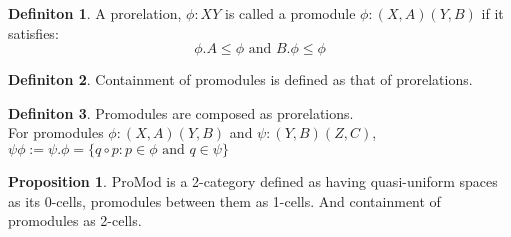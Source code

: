 \documentclass[18pt,a4paper]{article}
\makeatletter
\theoremstyle{definition}
\newtheorem{definition}{Definiton}[section]
\newtheorem{proop}{Proposition}[section]
\newcommand{\carrow}{}%
\DeclareRobustCommand{\carrow}{%
	\mathrel{\vphantom{\rightarrow}\mathpalette\circle@arrow\relax}%
}
\newcommand{\circle@arrow}[2]{%
	\m@th
	\ooalign{%
		\hidewidth$#1\circ\mkern1mu$\hidewidth\cr
	$#1\longrightarrow$\cr}%
}
\makeatother
\begin{document}
	\begin{definition}%
		A prorelation, $\phi:X \carrow Y$ is called a promodule $\phi: (X,A) \carrow (Y,B)$  if it
		satisfies:
		\[ \phi.A \leq \phi \text{ and } B. \phi \leq \phi \]
	\end{definition}
	\begin{definition} %
	Containment of promodules is defined as that of prorelations.
	\end{definition}
	\begin{definition} %
		Promodules are composed as prorelations.\\
		For promodules $\phi: (X,A) \carrow (Y,B)$ and $\psi:(Y,B)\carrow(Z,C)$,
		$\psi \phi := \psi.\phi = \{q \circ p :p\in \phi \text{ and } q \in \psi \}$
	\end{definition}
	\begin{proop}%
		ProMod is a 2-category defined as having quasi-uniform spaces as its 0-cells,
		promodules between them as 1-cells. And containment of promodules as 2-cells.
	\end{proop}
\end{document}
